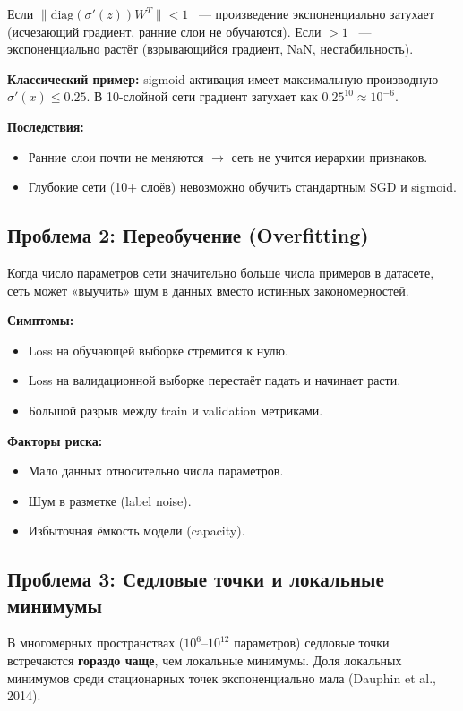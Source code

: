 \documentclass[a4paper,12pt]{article}
\begin{document}
Если $\|\text{diag}(\sigma'(z)) W^T\| < 1$ ~--- произведение экспоненциально затухает (исчезающий градиент, ранние слои не обучаются). Если $> 1$ ~--- экспоненциально растёт (взрывающийся градиент, NaN, нестабильность).

\textbf{Классический пример:} sigmoid-активация имеет максимальную производную $\sigma'(x) \le 0.25$. В 10-слойной сети градиент затухает как $0.25^{10} \approx 10^{-6}$.

\textbf{Последствия:}
\begin{itemize}
    \item Ранние слои почти не меняются $\to$ сеть не учится иерархии признаков.
    \item Глубокие сети (10+ слоёв) невозможно обучить стандартным SGD и sigmoid.
\end{itemize}

\subsection{Проблема 2: Переобучение (Overfitting)}

Когда число параметров сети значительно больше числа примеров в датасете, сеть может «выучить» шум в данных вместо истинных закономерностей.

\textbf{Симптомы:}
\begin{itemize}
    \item Loss на обучающей выборке стремится к нулю.
    \item Loss на валидационной выборке перестаёт падать и начинает расти.
    \item Большой разрыв между train и validation метриками.
\end{itemize}

\textbf{Факторы риска:}
\begin{itemize}
    \item Мало данных относительно числа параметров.
    \item Шум в разметке (label noise).
    \item Избыточная ёмкость модели (capacity).
\end{itemize}

\subsection{Проблема 3: Седловые точки и локальные минимумы}

В многомерных пространствах ($10^6$--$10^{12}$ параметров) седловые точки встречаются \textbf{гораздо чаще}, чем локальные минимумы. Доля локальных минимумов среди стационарных точек экспоненциально мала (Dauphin et al., 2014).
\end{document}

